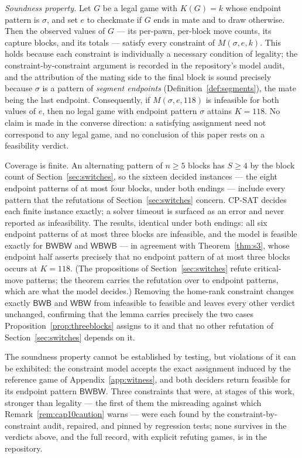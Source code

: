 \documentclass[11pt]{article}
\theoremstyle{definition}
\theoremstyle{remark}
\theoremstyle{plain}
\begin{document}
\emph{Soundness property.} Let $G$ be a legal game with $K(G) = k$ whose
endpoint pattern is $\sigma$, and set $e$ to checkmate if $G$ ends
in mate and to draw otherwise. Then the observed values of $G$ --- its
per-pawn, per-block move counts, its capture blocks, and its totals ---
satisfy every constraint of $M(\sigma, e, k)$. This holds because each
constraint is individually a necessary condition of legality; the
constraint-by-constraint argument is recorded in the repository's model
audit, and the attribution of the mating side to the final block is sound
precisely because $\sigma$ is a pattern of \emph{segment endpoints}
(Definition~\ref{def:segments}), the mate being the last endpoint.
Consequently, if $M(\sigma, e, 118)$ is infeasible for both values of $e$,
then no legal game with endpoint pattern $\sigma$ attains $K = 118$. No
claim is made in the converse direction: a satisfying assignment need not
correspond to any legal game, and no conclusion of this paper rests on a
feasibility verdict.

Coverage is finite. An alternating pattern of $n \ge 5$ blocks has $S \ge 4$
by the block count of Section~\ref{sec:switches}, so the sixteen decided
instances --- the eight endpoint patterns of at most four blocks, under
both endings
--- include every pattern that the refutations of
Section~\ref{sec:switches} concern. CP-SAT decides
each finite instance exactly; a solver timeout is surfaced as an error and
never reported as infeasibility. The results, identical under both
endings: all six endpoint patterns of at most three blocks are
infeasible, and the model is feasible exactly for $\mathsf{BWBW}$ and
$\mathsf{WBWB}$ --- in agreement with Theorem~\ref{thm:s3}, whose
endpoint half asserts precisely that no endpoint pattern of at most
three blocks occurs at $K = 118$. (The propositions of
Section~\ref{sec:switches} refute critical-move patterns; the theorem
carries the refutation over to endpoint patterns, which are what the
model decides.) Removing
the home-rank constraint changes exactly $\mathsf{BWB}$ and
$\mathsf{WBW}$ from infeasible to feasible and leaves every other verdict
unchanged, confirming that the lemma carries precisely the two cases
Proposition~\ref{prop:threeblocks} assigns to it and that no other
refutation of Section~\ref{sec:switches} depends on it.

The soundness property cannot be established by testing, but violations
of it can be exhibited: the constraint model accepts the exact
assignment induced by the reference game of Appendix~\ref{app:witness},
and both deciders return feasible for its endpoint pattern
$\mathsf{BWBW}$. Three constraints that were, at stages of this work,
stronger than legality --- the first of them the misreading against
which Remark~\ref{rem:cap10caution} warns --- were each found by the
constraint-by-constraint audit, repaired, and pinned by regression
tests; none survives in the verdicts above, and the full record, with
explicit refuting games, is in the repository.
\end{document}
